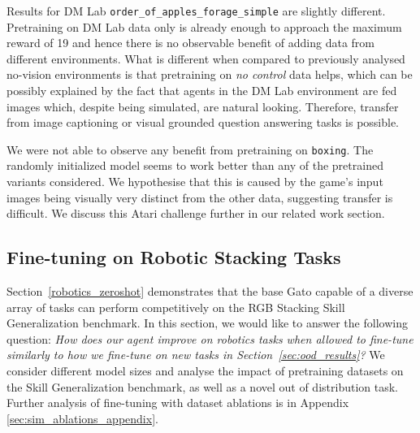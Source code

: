 \documentclass[10pt]{article} \usepackage[accepted]{tmlr}
\newcommand{\model}{{Gato}}
\newcommand{\dmlab}{{DM Lab}}
\begin{document}
Results for \dmlab{} \texttt{order\_of\_apples\_forage\_simple} are slightly different.
Pretraining on \dmlab{} data only is already enough to approach the maximum reward of 19 and hence there is no observable benefit of adding data from different environments.
What is different when compared to previously analysed no-vision environments is that pretraining on \textit{no control} data helps,
which can be possibly explained by the fact that agents in the \dmlab{} environment are fed images which, despite being simulated, are natural looking.
Therefore, transfer from image captioning or visual grounded question answering tasks is possible.


We were not able to observe any benefit from pretraining on \texttt{boxing}.
The randomly initialized model seems to work better than any of the pretrained variants considered.
We hypothesise that this is caused by the game's input images being visually very distinct from the other data, suggesting transfer is difficult.
We discuss this Atari challenge further in our related work section.
\vskip 0.4cm
\subsection{Fine-tuning on Robotic Stacking Tasks}
\label{sec:skill_gen}
\vskip 0.2cm
Section~\ref{robotics_zeroshot} demonstrates that the base \model{} capable of a diverse array of tasks can perform competitively on the RGB Stacking Skill Generalization benchmark.
In this section, we would like to answer the following question:
\emph{How does our agent improve on robotics tasks when allowed to fine-tune similarly to how we fine-tune on new tasks in Section~\ref{sec:ood_results}?}
We consider different model sizes and analyse the impact of pretraining datasets on the Skill Generalization benchmark, as well as a novel out of distribution task. Further analysis of fine-tuning with dataset ablations is in Appendix \ref{sec:sim_ablations_appendix}.
\end{document}
